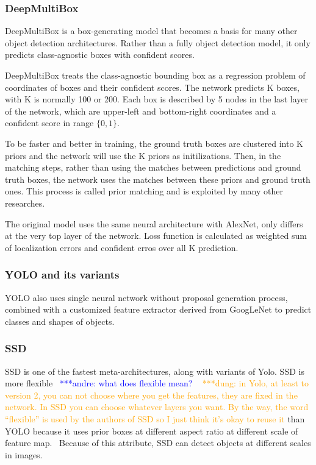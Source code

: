 \documentclass[conference]{IEEEtran}
\newcommand{\alnote}[1]{ {\textcolor{blue} { ***andre: #1 }}}
\newcommand{\dungnote}[1]{ {\textcolor{orange} { ***dung: #1 }}}
\newcommand{\alnote}[1]{}
\newcommand{\dungnote}[1]{}
\begin{document}
\subsubsection{DeepMultiBox}
DeepMultiBox is a box-generating model that becomes a basis for many other object detection architectures. Rather than a fully object detection model, it only predicts class-agnostic boxes with confident scores.

DeepMultiBox treats the class-agnostic bounding box as a regression problem of coordinates of boxes and their confident scores. The network predicts K boxes, with K is normally 100 or 200. Each box is described by 5 nodes in the last layer of the network, which are upper-left and bottom-right coordinates and a confident score in range $\{0, 1\}$.

To be faster and better in training, the ground truth boxes are clustered into K priors and the network will use the K priors as initilizations. Then, in the matching steps, rather than using the matches between predictions and ground truth boxes, the network uses the matches between these priors and ground truth ones. This process is called prior matching and is exploited by many other researches.

The original model uses the same neural architecture with AlexNet, only differs at the very top layer of the network. Loss function is calculated as weighted sum of localization errors and confident erros over all K prediction.


\subsubsection{YOLO and its variants}
YOLO also uses single neural network without proposal generation process, combined with a customized feature extractor derived from GoogLeNet to predict classes and shapes of objects.


\subsubsection{SSD}
SSD is one of the fastest meta-architectures, along with variants of Yolo. SSD is more flexible~\alnote{what does flexible mean?} ~\dungnote{in Yolo, at least to version 2, you can not choose where you get the features, they are fixed in the network. In SSD you can choose whatever layers you want. By the way, the word ``flexible'' is used by the authors of SSD so I just think it's okay to reuse it}than YOLO because it uses prior boxes at different aspect ratio at different scale of feature map.~\cite{liu2016ssd} Because of this attribute, SSD can detect objects at different scales in images.
\end{document}
